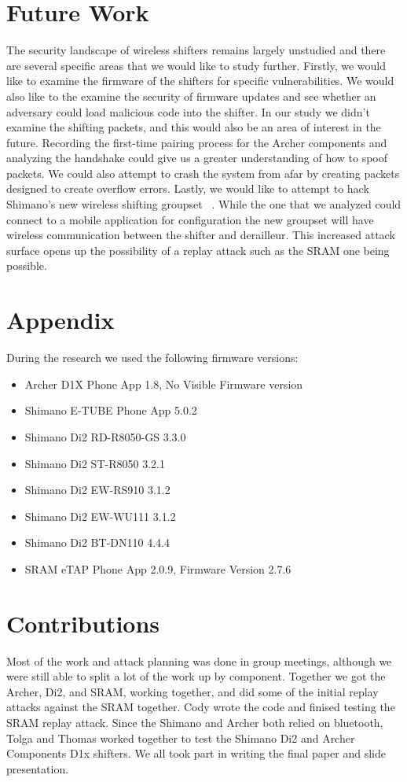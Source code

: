 \documentclass[letterpaper,twocolumn,10pt]{article}
\begin{document}
\section{Future Work}

The security landscape of wireless shifters remains largely unstudied and there are several specific areas that we would like to study further. Firstly, we would like to examine the firmware of the shifters for specific vulnerabilities. We would also like to the examine the security of firmware updates and see whether an adversary could load malicious code into the shifter. In our study we didn’t examine the shifting packets, and this would also be an area of interest in the future. Recording the first-time pairing process for the Archer components and analyzing the handshake could give us a greater understanding of how to spoof packets. We could also attempt to crash the system from afar by creating packets designed to create overflow errors. Lastly, we would like to attempt to hack Shimano’s new wireless shifting groupset~ \cite{newshimano}. While the one that we analyzed could connect to a mobile application for configuration the new groupset will have wireless communication between the shifter and derailleur. This increased attack surface opens up the possibility of a replay attack such as the SRAM one being possible.


  {\normalsize 
    }


\section{Appendix}
During the research we used the following firmware versions:
\begin{itemize}
  \item Archer D1X Phone App 1.8, No Visible Firmware version
  \item Shimano E-TUBE Phone App 5.0.2
  \item Shimano Di2 RD-R8050-GS 3.3.0
  \item Shimano Di2 ST-R8050 3.2.1
  \item Shimano Di2 EW-RS910 3.1.2
  \item Shimano Di2 EW-WU111 3.1.2
  \item Shimano Di2 BT-DN110 4.4.4 
  \item SRAM eTAP Phone App 2.0.9, Firmware Version 2.7.6
\end{itemize}
\section{Contributions}

Most of the work and attack planning was done in group meetings, although we were still able to split a lot of the work up by component. Together we got the Archer, Di2, and SRAM, working together, and did some of the initial replay attacks against the SRAM together. Cody wrote the code and finised testing the SRAM replay attack. Since the Shimano and Archer both relied on bluetooth, Tolga and Thomas worked together to test the Shimano Di2 and Archer Components D1x shifters. We all took part in writing the final paper and slide presentation.

\end{document}
